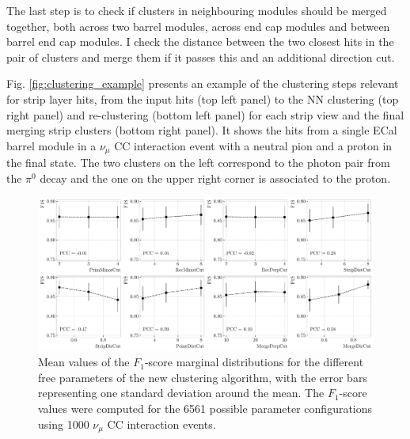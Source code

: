 The last step is to check if clusters in neighbouring modules should be merged together, both across two barrel modules, across end cap modules and between barrel end cap modules. I check the distance between the two closest hits in the pair of clusters and merge them if it passes this and an additional direction cut.

Fig. \ref{fig:clustering_example} presents an example of the clustering steps relevant for strip layer hits, from the input hits (top left panel) to the NN clustering (top right panel) and re-clustering (bottom left panel) for each strip view and the final merging strip clusters (bottom right panel). It shows the hits from a single ECal barrel module in a $\nu_{\mu}$ CC interaction event with a neutral pion and a proton in the final state. The two clusters on the left correspond to the photon pair from the $\pi^{0}$ decay and the one on the upper right corner is associated to the proton.

\begin{figure}[t]
	\centering
	\includegraphics[width=.99\linewidth]{Images/GArSoft_PID/Neutral/coolcluster_optimisation_F1S.pdf}
	\caption{Mean values of the $F_{1}$-score marginal distributions for the different free parameters of the new clustering algorithm, with the error bars representing one standard deviation around the mean. The $F_{1}$-score values were computed for the 6561 possible parameter configurations using 1000 $\nu_{\mu}$ CC interaction events.}
	\label{fig:clustering_optimisation}
\end{figure}

